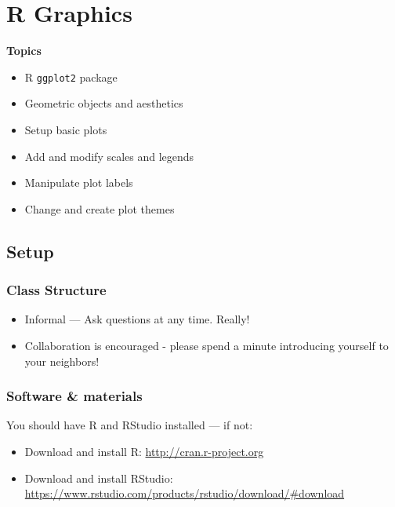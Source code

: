 \documentclass[]{book}
\providecommand{\tightlist}{%
  \setlength{\itemsep}{0pt}\setlength{\parskip}{0pt}}
\begin{document}
\hypertarget{r-graphics}{%
\chapter{R Graphics}\label{r-graphics}}

\textbf{Topics}

\begin{itemize}
\tightlist
\item
  R \texttt{ggplot2} package
\item
  Geometric objects and aesthetics
\item
  Setup basic plots
\item
  Add and modify scales and legends
\item
  Manipulate plot labels
\item
  Change and create plot themes
\end{itemize}

\hypertarget{setup-2}{%
\section{Setup}\label{setup-2}}

\hypertarget{class-structure-2}{%
\subsection{Class Structure}\label{class-structure-2}}

\begin{itemize}
\tightlist
\item
  Informal --- Ask questions at any time. Really!
\item
  Collaboration is encouraged - please spend a minute introducing yourself to your neighbors!
\end{itemize}

\hypertarget{software-materials-2}{%
\subsection{Software \& materials}\label{software-materials-2}}

You should have R and RStudio installed --- if not:

\begin{itemize}
\tightlist
\item
  Download and install R: \url{http://cran.r-project.org}
\item
  Download and install RStudio: \url{https://www.rstudio.com/products/rstudio/download/\#download}
\end{itemize}
\end{document}
